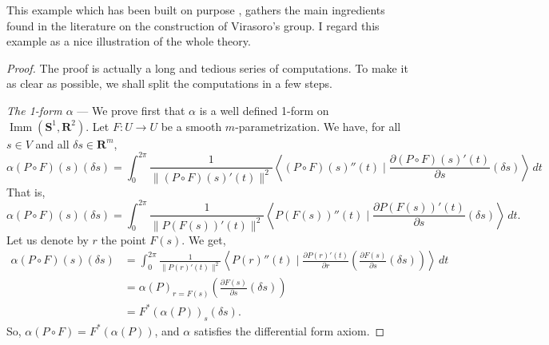 \documentclass[10pt,reqno,twoside]{amsart}
\DeclareMathOperator{\Imm}{Imm}
\theoremstyle{plain}
\theoremstyle{definition}
\begin{document}
  This example which has been built on purpose \cite{Igl95},
  gathers the main ingredients found in the literature on the construction of Virasoro's group.
  I regard this example as a nice illustration of the whole theory.
  
  \begin{proof}
    The proof is actually a long and tedious series of computations.
    To make it as clear as possible,
    we shall split the computations in a few steps.
    
    \emph{The 1-form $\alpha$} --- We prove first that $\alpha$ is a well defined 1-form on $\Imm(\mathbf{S}^1,\mathbf{R}^2)$.
    Let $F : U \to U$ be a smooth $m$-parametrization.
    We have,
    for all $s \in V$ and all $\delta s \in \mathbf{R}^m$,
    \[
    \alpha(P \circ F)(s)(\delta s) = \int_0^{2\pi} \frac{1}{\lVert (P \circ F)(s)'(t)\rVert^2} \left\langle(P \circ F)(s)''(t) \mid \frac{\partial (P \circ F)(s)'(t)}{\partial s}(\delta s)\right\rangle \, dt
    \]
    That is,
    \[
    \alpha(P \circ F)(s)(\delta s) = \int_0^{2\pi} \frac{1}{\lVert P(F(s))'(t)\rVert^2} \left\langle P(F(s))''(t) \mid \frac{\partial P(F(s))'(t)}{\partial s}(\delta s) \right\rangle \, dt.
    \]
    Let us denote by $r$ the point $F(s)$.
    We get,
    \begin{align*}
      \alpha(P \circ F)(s) (\delta s) & = \int_0^{2\pi} \frac{1}{\lVert P(r)'(t)\rVert^2} \left\langle P(r)''(t) \mid \frac{\partial P(r)'(t)}{\partial r} \left( \frac{\partial F(s)}{\partial s} (\delta s) \right) \right\rangle \, dt \\
      & = \alpha(P)_{r = F(s)} \left(\frac{\partial F(s)}{\partial s}(\delta s) \right) \\
      & = F^*(\alpha(P))_s(\delta s).
    \end{align*}
    So,
    $\alpha(P \circ F) = F^*(\alpha(P))$,
    and $\alpha$ satisfies the differential form axiom.
    

\end{proof}
\end{document}
